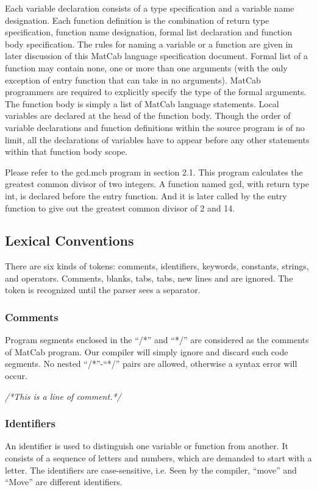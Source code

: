\documentclass[12pt]{article} %
\begin{document}
Each variable declaration consists of a type specification and a variable name designation. Each function definition is the combination of return type specification, function name designation, formal list declaration and function body specification. The rules for naming a variable or a function are given in later discussion of this MatCab language specification document. Formal list of a function may contain none, one or more than one arguments (with the only exception of entry function that can take in no arguments). MatCab programmers are required to explicitly specify the type of the formal arguments. The function body is simply a list of MatCab language statements. Local variables are declared at the head of the function body. Though the order of variable declarations and function definitions within the source program is of no limit, all the declarations of variables have to appear before any other statements within that function body scope.

Please refer to the gcd.mcb program in section 2.1. This program calculates the greatest common divisor of two integers. A function named gcd, with return type int, is declared before the entry function. And it is later called by the entry function to give out the greatest common divisor of 2 and 14.


\subsection{Lexical Conventions} %

There are six kinds of tokens: comments, identifiers, keywords, constants, strings, and operators. Comments, blanks, tabs, tabs, new lines and are ignored. The token is recognized until the parser sees a separator.
\subsubsection{Comments} 
Program segments enclosed in the ``/*'' and ``*/'' are considered as the comments of MatCab program. Our compiler will simply ignore and discard such code segments. No nested ``/*''-``*/'' pairs are allowed, otherwise a syntax error will occur.

\begin{center}
\emph{/*This is a line of comment.*/}
\end{center}

\subsubsection{Identifiers}
An identifier is used to distinguish one variable or function from another. It consists of a sequence of letters and numbers, which are demanded to start with a letter. The identifiers are case-sensitive, i.e. Seen by the compiler, ``move'' and ``Move'' are different identifiers.
\end{document}
